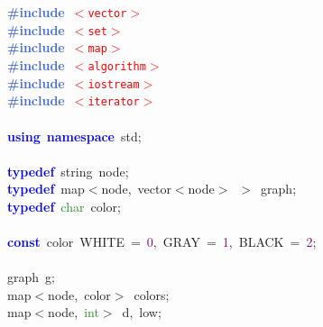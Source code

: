 \noindent
\mbox{}\textbf{\textcolor{RoyalBlue}{\#include}}\ \texttt{\textcolor{Red}{$<$vector$>$}} \\
\mbox{}\textbf{\textcolor{RoyalBlue}{\#include}}\ \texttt{\textcolor{Red}{$<$set$>$}} \\
\mbox{}\textbf{\textcolor{RoyalBlue}{\#include}}\ \texttt{\textcolor{Red}{$<$map$>$}} \\
\mbox{}\textbf{\textcolor{RoyalBlue}{\#include}}\ \texttt{\textcolor{Red}{$<$algorithm$>$}} \\
\mbox{}\textbf{\textcolor{RoyalBlue}{\#include}}\ \texttt{\textcolor{Red}{$<$iostream$>$}} \\
\mbox{}\textbf{\textcolor{RoyalBlue}{\#include}}\ \texttt{\textcolor{Red}{$<$iterator$>$}} \\
\mbox{} \\
\mbox{}\textbf{\textcolor{Blue}{using}}\ \textbf{\textcolor{Blue}{namespace}}\ std\textcolor{BrickRed}{;} \\
\mbox{} \\
\mbox{}\textbf{\textcolor{Blue}{typedef}}\ string\ node\textcolor{BrickRed}{;} \\
\mbox{}\textbf{\textcolor{Blue}{typedef}}\ map\textcolor{BrickRed}{$<$}node\textcolor{BrickRed}{,}\ vector\textcolor{BrickRed}{$<$}node\textcolor{BrickRed}{$>$}\ \textcolor{BrickRed}{$>$}\ graph\textcolor{BrickRed}{;} \\
\mbox{}\textbf{\textcolor{Blue}{typedef}}\ \textcolor{ForestGreen}{char}\ color\textcolor{BrickRed}{;} \\
\mbox{} \\
\mbox{}\textbf{\textcolor{Blue}{const}}\ color\ WHITE\ \textcolor{BrickRed}{=}\ \textcolor{Purple}{0}\textcolor{BrickRed}{,}\ GRAY\ \textcolor{BrickRed}{=}\ \textcolor{Purple}{1}\textcolor{BrickRed}{,}\ BLACK\ \textcolor{BrickRed}{=}\ \textcolor{Purple}{2}\textcolor{BrickRed}{;} \\
\mbox{} \\
\mbox{}graph\ g\textcolor{BrickRed}{;} \\
\mbox{}map\textcolor{BrickRed}{$<$}node\textcolor{BrickRed}{,}\ color\textcolor{BrickRed}{$>$}\ colors\textcolor{BrickRed}{;} \\
\mbox{}map\textcolor{BrickRed}{$<$}node\textcolor{BrickRed}{,}\ \textcolor{ForestGreen}{int}\textcolor{BrickRed}{$>$}\ d\textcolor{BrickRed}{,}\ low\textcolor{BrickRed}{;} \\
\mbox{} \\
